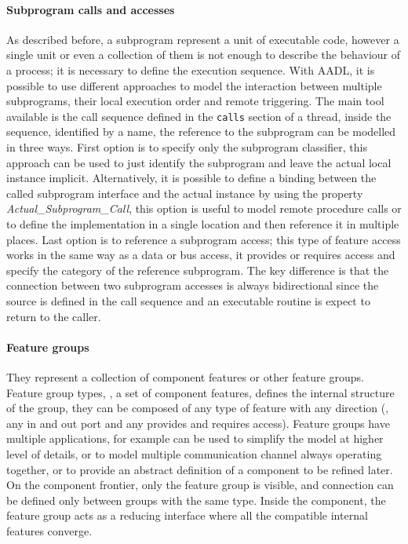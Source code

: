 \paragraph{Subprogram calls and accesses}
As described before, a subprogram represent a unit of executable code, however a single unit or even a collection of them is not enough to describe the behaviour of a process; it is necessary to define the execution sequence. With AADL, it is possible to use different approaches to model the interaction between multiple subprograms, their local execution order and remote triggering. The main tool available is the call sequence defined in the \texttt{calls} section of a thread, inside the sequence, identified by a name, the reference to the subprogram can be modelled in three ways. First option is to specify only the subprogram classifier, this approach can be used to just identify the subprogram and leave the actual local instance implicit. Alternatively, it is possible to define a binding between the called subprogram interface and the actual instance by using the property \textit{Actual\_Subprogram\_Call}, this option is useful to model remote procedure calls or to define the implementation in a single location and then reference it in multiple places. Last option is to reference a subprogram access; this type of feature access works in the same way as a data or bus access, it provides or requires access and specify the category of the reference subprogram. The key difference is that the connection between two subprogram accesses is always bidirectional since the source is defined in the call sequence and an executable routine is expect to return to the caller.

\paragraph{Feature groups}
They represent a collection of component features or other feature groups. Feature group types, \ie, a set of component features, defines the internal structure of the group, they can be composed of any type of feature with any direction (\ie, any in and out port and any provides and requires access). Feature groups have multiple applications, for example can be used to simplify the model at higher level of details, or to model multiple communication channel always operating together, or to provide an abstract definition of a component to be refined later. On the component frontier, only the feature group is visible, and connection can be defined only between groups with the same type. Inside the component, the feature group acts as a reducing interface where all the compatible internal features converge.

